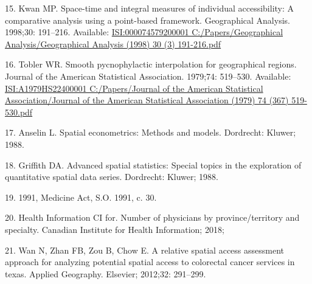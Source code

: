 \documentclass[10pt,letterpaper]{article}
\begin{document}
\hypertarget{ref-Kwan1998}{}
15. Kwan MP. Space-time and integral measures of individual
accessibility: A comparative analysis using a point-based framework.
Geographical Analysis. 1998;30: 191--216. Available:
\href{ISI:000074579200001\%0AC:/Papers/Geographical\%20Analysis/Geographical\%20Analysis\%20(1998)\%2030\%20(3)\%20191-216.pdf}{ISI:000074579200001
C:/Papers/Geographical Analysis/Geographical Analysis (1998) 30 (3) 191-216.pdf}

\hypertarget{ref-Tobler1979}{}
16. Tobler WR. Smooth pycnophylactic interpolation for geographical
regions. Journal of the American Statistical Association. 1979;74:
519--530. Available:
\href{ISI:A1979HS22400001\%0AC:/Papers/Journal\%20of\%20the\%20American\%20Statistical\%20Association/Journal\%20of\%20the\%20American\%20Statistical\%20Association\%20(1979)\%2074\%20(367)\%20519-530.pdf}{ISI:A1979HS22400001
C:/Papers/Journal of the American Statistical Association/Journal of the American Statistical Association (1979) 74 (367) 519-530.pdf}

\hypertarget{ref-Anselin1988}{}
17. Anselin L. Spatial econometrics: Methods and models. Dordrecht:
Kluwer; 1988.

\hypertarget{ref-Griffith1988}{}
18. Griffith DA. Advanced spatial statistics: Special topics in the
exploration of quantitative spatial data series. Dordrecht: Kluwer;
1988.

\hypertarget{ref-Ontario1991}{}
19. 1991, Medicine Act, S.O. 1991, c. 30.

\hypertarget{ref-CIHI2018}{}
20. Health Information CI for. Number of physicians by
province/territory and specialty. Canadian Institute for Health
Information; 2018;

\hypertarget{ref-Wan2012SPAR}{}
21. Wan N, Zhan FB, Zou B, Chow E. A relative spatial access assessment
approach for analyzing potential spatial access to colorectal cancer
services in texas. Applied Geography. Elsevier; 2012;32: 291--299.

\nolinenumbers
\end{document}
